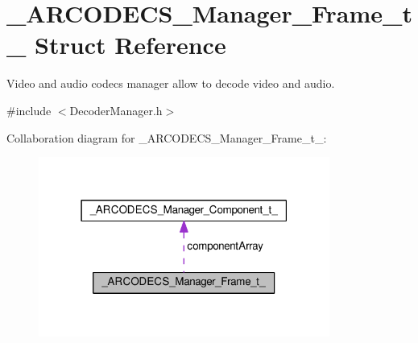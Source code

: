 \hypertarget{struct__ARCODECS__Manager__Frame__t__}{}\section{\+\_\+\+A\+R\+C\+O\+D\+E\+C\+S\+\_\+\+Manager\+\_\+\+Frame\+\_\+t\+\_\+ Struct Reference}
\label{struct__ARCODECS__Manager__Frame__t__}


Video and audio codecs manager allow to decode video and audio.  




{\ttfamily \#include $<$Decoder\+Manager.\+h$>$}



Collaboration diagram for \+\_\+\+A\+R\+C\+O\+D\+E\+C\+S\+\_\+\+Manager\+\_\+\+Frame\+\_\+t\+\_\+\+:
\nopagebreak
\begin{figure}[H]
\begin{center}
\leavevmode
\includegraphics[width=271pt]{struct__ARCODECS__Manager__Frame__t____coll__graph}
\end{center}
\end{figure}
